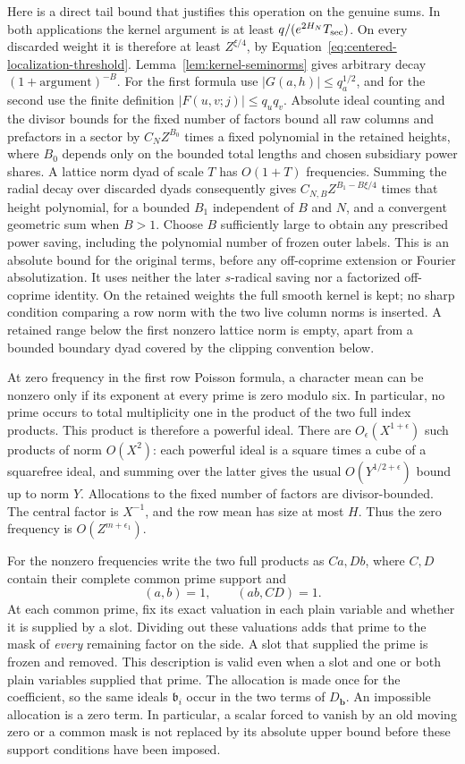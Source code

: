 \documentclass[12pt]{article}
\begin{document}
Here is a direct tail bound that justifies this operation on the
genuine sums.  In both applications the kernel argument is at least
\(q/(e^{2H_N}T_{\rm sec})\).  On every discarded weight it is
therefore at least \(Z^{\xi/4}\), by
Equation~\eqref{eq:centered-localization-threshold}.
Lemma~\ref{lem:kernel-seminorms} gives arbitrary decay
\((1+\text{argument})^{-B}\).  For the first formula use
\(|G(a,h)|\le q_a^{1/2}\), and for the second use the finite
definition \(|F(u,v;j)|\le q_uq_v\).  Absolute ideal counting and
the divisor bounds for the fixed number of factors bound all raw
columns and prefactors in a sector by \(C_NZ^{B_0}\) times a fixed
polynomial in the retained heights, where \(B_0\) depends only on
the bounded total lengths and chosen subsidiary power shares.  A
lattice norm dyad of scale \(T\) has \(O(1+T)\) frequencies.
Summing the radial decay over discarded dyads consequently gives
\(C_{N,B}Z^{B_1-B\xi/4}\) times that height polynomial, for a
bounded \(B_1\) independent of \(B\) and \(N\), and a convergent
geometric sum when \(B>1\).
Choose \(B\) sufficiently large to obtain any prescribed power
saving, including the polynomial number of frozen outer labels.
This is an absolute bound for the original terms, before any
off-coprime extension or Fourier absolutization.  It uses neither
the later \(s\)-radical saving nor a factorized off-coprime identity.
On the retained weights the full smooth kernel is kept; no sharp
condition comparing a row norm with the two live column norms is
inserted.  A retained range below the first nonzero lattice norm is
empty, apart from a bounded boundary dyad covered by the clipping
convention below.

At zero frequency in the first row Poisson formula, a character mean
can be nonzero only if its exponent at every prime is zero modulo
six.  In particular, no prime occurs to total multiplicity one in
the product of the two full index products.  This product is
therefore a powerful ideal.  There are \(O_\epsilon(X^{1+\epsilon})\)
such products of norm \(O(X^2)\): each powerful ideal is a square
times a cube of a squarefree ideal, and summing over the latter gives
the usual \(O(Y^{1/2+\epsilon})\) bound up to norm \(Y\).
Allocations to the fixed number of factors are divisor-bounded.
The central factor is \(X^{-1}\), and the row mean has size at most
\(H\).  Thus the zero frequency is \(O(Z^{m+\epsilon_1})\).

For the nonzero frequencies write the two full products as \(Ca,Db\),
where \(C,D\) contain their complete common prime support and
\[
 (a,b)=1,\qquad (ab,CD)=1.
\]
At each common prime, fix its exact
valuation in each plain variable and whether it is supplied by a
slot.  Dividing out these valuations adds that prime to the mask of
\emph{every} remaining factor on the side.  A slot that supplied the
prime is frozen and removed.  This description is valid even when a
slot and one or both plain variables supplied that prime.  The
allocation is made once for the coefficient, so the same ideals
\(\mathfrak b_i\) occur in the two terms of \(D_{\mathbf b}\).
An impossible allocation is a zero term.  In particular, a scalar
forced to vanish by an old moving zero or a common mask is not
replaced by its absolute upper bound before these support conditions
have been imposed.
\end{document}
